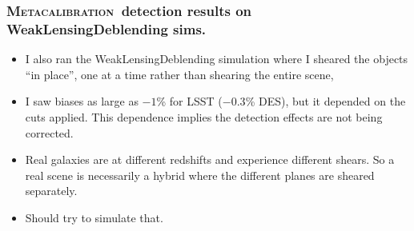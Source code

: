 \documentclass{beamer}
\newcommand{\Mcal}{\textsc{Metacalibration}}
\begin{document}
\begin{frame}
    \frametitle{\Mcal\ detection results on WeakLensingDeblending sims.}

 
    \begin{itemize}

        \item I also ran the WeakLensingDeblending simulation where I sheared the
            objects ``in place'', one at a time rather than shearing the entire
            scene, 

        \item I saw biases as large as $-1$\% for LSST ($-0.3$\% DES), but it
            depended on the cuts applied.  This dependence implies the
            detection effects are not being corrected.

        \item Real galaxies are at different redshifts and experience different
            shears. So a real scene is necessarily a hybrid
            where the different planes are sheared separately.

        \item Should try to simulate that.

    \end{itemize}



\end{frame}
\end{document}
